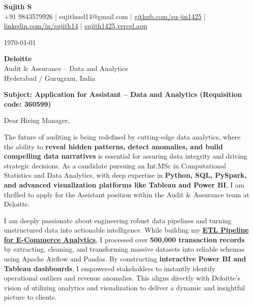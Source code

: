 \documentclass[a4paper,11pt]{article}
\newcommand{\ulink}[2]{\href{#1}{#2}}
\begin{document}
\pagestyle{empty}

\begin{center}
{\color[HTML]{000000}\fontsize{30}{35}\selectfont\bfseries Sujith S} \\[5pt]
{\fontsize{10.5}{12.5}\selectfont\textcolor[HTML]{3A3A3A}{+91 9843579926 $|$ sujithssd14@gmail.com $|$ \ulink{https://github.com/su-jin1425}{github.com/su-jin1425} $|$ \ulink{https://linkedin.com/in/sujith14}{linkedin.com/in/sujith14} $|$ \ulink{https://sujith1425.vercel.app}{sujith1425.vercel.app}}}
\end{center}

\vspace{10pt}

\today

\textbf{Deloitte} \\
Audit \& Assurance -- Data and Analytics \\
Hyderabad / Gurugram, India

\textbf{Subject: Application for Assistant -- Data and Analytics (Requisition code: 360599)}

Dear Hiring Manager,

The future of auditing is being redefined by cutting-edge data analytics, where the ability to \textbf{reveal hidden patterns, detect anomalies, and build compelling data narratives} is essential for assuring data integrity and driving strategic decisions. As a candidate pursuing an Int.MSc in Computational Statistics and Data Analytics, with deep expertise in \textbf{Python, SQL, PySpark, and advanced visualization platforms like Tableau and Power BI}, I am thrilled to apply for the Assistant position within the Audit \& Assurance team at Deloitte.

I am deeply passionate about engineering robust data pipelines and turning unstructured data into actionable intelligence. While building my \ulink{https://github.com/su-jin1425/ETL-Pipeline-for-E-Commerce-Analytics}{\textbf{ETL Pipeline for E-Commerce Analytics}}, I processed over \textbf{500,000 transaction records} by extracting, cleaning, and transforming massive datasets into reliable schemas using Apache Airflow and Pandas. By constructing \textbf{interactive Power BI and Tableau dashboards}, I empowered stakeholders to instantly identify operational outliers and revenue anomalies. This aligns directly with Deloitte's vision of utilizing analytics and visualization to deliver a dynamic and insightful picture to clients.
\end{document}
